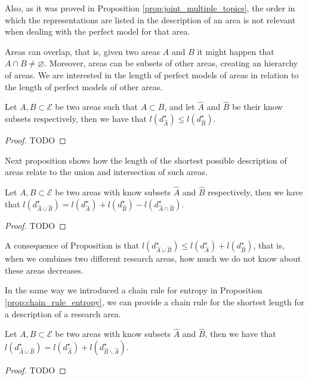 Also, as it was proved in Proposition \ref{prop:joint_multiple_topics}, the order in which the representations are listed in the description of an area is not relevant when dealing with the perfect model for that area.

Areas can overlap, that is, given two areas $A$ and $B$ it might happen that $A \cap B \neq \varnothing$. Moreover, areas can be subsets of other areas, creating an hierarchy of areas. We are interested in the length of perfect models of areas in relation to the length of perfect models of other areas.

\begin{proposition}
Let $A, B \subset \mathcal{E}$ be two areas such that $A \subset B$, and let $\hat{A}$ and $\hat{B}$ be their know subsets respectively, then we have that $l \left( d_{\hat{A}}^{\star} \right) \leq l \left( d_{\hat{B}}^{\star} \right)$.
\end{proposition}
\begin{proof}
{\color{red} TODO}
\end{proof}

Next proposition \label{prop:areas_union} shows how the length of the shortest possible description of areas relate to the union and intersection of such areas.

\begin{proposition}
\label{prop:areas_union}
Let $A, B \subset \mathcal{E}$ be two areas with know subsets $\hat{A}$ and $\hat{B}$ respectively, then we have that $l \left( d_{\hat{A} \cup \hat{B}}^{\star} \right) = l \left( d_{\hat{A}}^{\star} \right) + l \left( d_{\hat{B}}^{\star} \right) - l \left( d_{\hat{A} \cap \hat{B}}^{\star} \right)$.
\end{proposition}
\begin{proof}
{\color{red} TODO}
\end{proof}

A consequence of Proposition \label{prop:areas_union} is that $l \left( d_{\hat{A} \cup \hat{B}}^{\star} \right) \leq l \left( d_{\hat{A}}^{\star} \right) + l \left( d_{\hat{B}}^{\star} \right)$, that is, when we combines two different research areas, how much we do not know about these areas decreases.

In the same way we introduced a chain rule for entropy in Proposition \ref{prop:chain_rule_entropy}, we can provide a chain rule for the shortest length for a description of a research area.

\begin{proposition}
Let $A, B \subset \mathcal{E}$ be two areas with know subsets $\hat{A}$ and $\hat{B}$, then we have that $l \left( d_{\hat{A} \cup \hat{B}}^{\star} \right) = l \left( d_{\hat{A}}^{\star} \right) + l \left( d_{\hat{B} \backslash \hat{A}}^{\star} \right)$.
\end{proposition}
\begin{proof}
{\color{red} TODO}
\end{proof}

